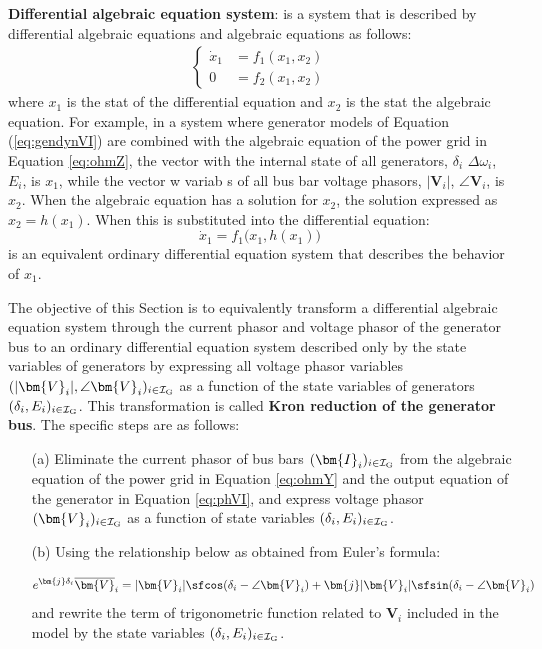 \documentclass[graybox, envcountchap]{svmult}
\begin{document}
\begin{COLUMN}
\noindent \textbf{Differential algebraic equation system}:
is a system that is described by differential algebraic equations and algebraic equations as follows:
\begin{equation*}
  \begin{aligned}
    \begin{cases}
    \dot{x}_1 &= f_1(x_1,x_2) \\
    0 &= f_2(x_1,x_2)
    \end{cases}
  \end{aligned}
\end{equation*}
where $x_1$ is the stat of the differential equation and $x_2$ is the stat the
algebraic equation.  For example, in a system where generator models of Equation
(\ref{eq:gendynVI}) are combined with the algebraic equation of the power grid
in Equation \ref{eq:ohmZ}, the vector with the internal state of all generators,
$\delta_i$ $\Delta \omega_i$, $E_i$, is $x_1$, while the vector w variab s of
all bus bar voltage phasors, $|\bm{V}_i|$, $\angle \bm{V}_i$, is $x_2$.  When
the algebraic equation has a solution for $x_2$, the solution expressed as $x_2=
h(x_1)$. When this is substituted into the differential equation:
\[
\dot{x}_1 = f_1\bigl(x_1,h(x_1) \bigr)
\]
is an equivalent ordinary differential equation system that describes the behavior of $x_1$.
\end{COLUMN}


The objective of this Section is to equivalently transform a differential algebraic equation system through the current phasor and voltage phasor of the generator bus to an ordinary differential equation system described only by the state variables of generators by expressing all voltage phasor variables $(|\bm{V}_i|, \angle \bm{V}_i)_{i\in \mathcal{I}_{\rm G}}$ as a function of the state variables of generators $(\delta_i,E_i)_{i\in \mathcal{I}_{\rm G}}$.
This transformation is called \textbf{Kron reduction of the generator bus}.
The specific steps are as follows:

\medskip
\begin{breakbox} 
\begin{itemize}
\item[(a)] Eliminate the current phasor of bus bars $(\bm{I}_i)_{i\in \mathcal{I}_{\rm G}}$ from the algebraic equation of the power grid in Equation \ref{eq:ohmY} and the output equation of the generator in Equation \ref{eq:phVI}, and express voltage phasor $(\bm{V}_i)_{i\in \mathcal{I}_{\rm G}}$ as a function of state variables $(\delta_i,E_i)_{i\in \mathcal{I}_{\rm G}}$.
\item[(b)] Using the relationship below as obtained from Euler's formula:

\[
e^{\bm{j} \delta_i } \overline{\bm{V}}_i
= |{\bm{V}_i}| \sfcos (\delta_i -\angle \bm{V}_i )
+
\bm{j} |{\bm{V}_i}| \sfsin (\delta_i -\angle \bm{V}_i )
\]
and rewrite the term of trigonometric function related to $\bm{V}_i$ included in the model by the state variables $(\delta_i,E_i)_{i\in \mathcal{I}_{\rm G}}$.
\end{itemize}
\end{breakbox}
\medskip
\end{document}
